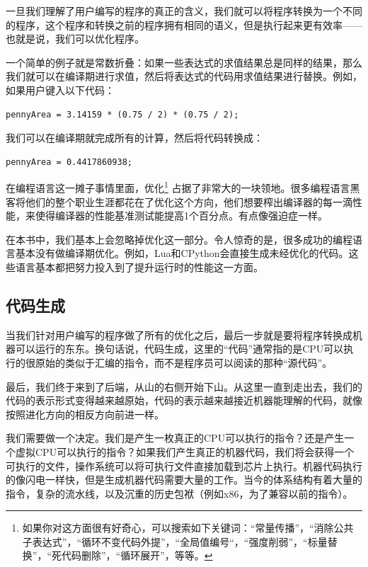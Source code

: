 \documentclass[cn,10pt,math=newtx,citestyle=gb7714-2015,bibstyle=gb7714-2015]{elegantbook}
\begin{document}
一旦我们理解了用户编写的程序的真正的含义，我们就可以将程序转换为一个不同的程序，这个程序和转换之前的程序拥有相同的语义，但是执行起来更有效率——也就是说，我们可以优化程序。

一个简单的例子就是常数折叠：如果一些表达式的求值结果总是同样的结果，那么我们就可以在编译期进行求值，然后将表达式的代码用求值结果进行替换。例如，如果用户键入以下代码：

\begin{verbatim}
pennyArea = 3.14159 * (0.75 / 2) * (0.75 / 2);
\end{verbatim}

我们可以在编译期就完成所有的计算，然后将代码转换成：

\begin{verbatim}
pennyArea = 0.4417860938;
\end{verbatim}

在编程语言这一摊子事情里面，优化\footnote{如果你对这方面很有好奇心，可以搜索如下关键词：“常量传播”，“消除公共子表达式”，“循环不变代码外提”，“全局值编号“，“强度削弱”，“标量替换”，“死代码删除”，“循环展开”，等等。} 占据了非常大的一块领地。很多编程语言黑客将他们的整个职业生涯都花在了优化这个方向，他们想要榨出编译器的每一滴性能，来使得编译器的性能基准测试能提高1个百分点。有点像强迫症一样。

在本书中，我们基本上会忽略掉优化这一部分。令人惊奇的是，很多成功的编程语言基本没有做编译期优化。例如，Lua和CPython会直接生成未经优化的代码。这些语言基本都把努力投入到了提升运行时的性能这一方面。

\subsection{代码生成}

当我们针对用户编写的程序做了所有的优化之后，最后一步就是要将程序转换成机器可以运行的东东。换句话说，代码生成，这里的“代码”通常指的是CPU可以执行的很原始的类似于汇编的指令，而不是程序员可以阅读的那种“源代码”。

最后，我们终于来到了后端，从山的右侧开始下山。从这里一直到走出去，我们的代码的表示形式变得越来越原始，代码的表示越来越接近机器能理解的代码，就像按照进化方向的相反方向前进一样。

我们需要做一个决定。我们是产生一枚真正的CPU可以执行的指令？还是产生一个虚拟CPU可以执行的指令？如果我们产生真正的机器代码，我们将会获得一个可执行的文件，操作系统可以将可执行文件直接加载到芯片上执行。机器代码执行的像闪电一样快，但是生成机器代码需要大量的工作。当今的体系结构有着大量的指令，复杂的流水线，以及沉重的历史包袱（例如x86，为了兼容以前的指令）。
\end{document}
